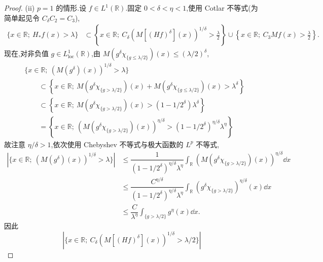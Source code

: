\begin{proof}
(ii) $p = 1$ 的情形.设 $f \in L^{1}(\mathbb{R})$.固定 $0 < \delta < \eta < 1$,使用 Cotlar 不等式(为简单起见令 $C_{\delta}C_{2} = C_{3}$),
\begin{equation}\tag{1.9.3}\begin{aligned}
\{x \in \mathbb{R};\ H_{*}f(x) > \lambda\}&\subset \left\{x \in \mathbb{R};\ C_{\delta}\left(M\left[(Hf)^{\delta}\right](x)\right)^{1/\delta} > \frac{\lambda}{2}\right\} \cup \left\{x \in \mathbb{R};\ C_{3}Mf(x) > \frac{\lambda}{2}\right\}.
 \end{aligned}\label{eq:1.9.3}\end{equation}
现在,对非负值 $g \in L_{\mathrm{loc}}^{1}(\mathbb{R})$,由 $M(g^{\delta}\chi_{\{g \leq \lambda/2\}})(x) \leq (\lambda/2)^{\delta}$,
\begin{align*}
& \{x \in \mathbb{R};\ \left(M(g^{\delta})(x)\right)^{1/\delta} > \lambda\} \\
& \qquad \subset \left\{x \in \mathbb{R};\ M(g^{\delta}\chi_{\{g > \lambda/2\}})(x) + M(g^{\delta}\chi_{\{g \leq \lambda/2\}})(x) > \lambda^{\delta}\right\} \\
& \qquad \subset \left\{x \in \mathbb{R};\ M(g^{\delta}\chi_{\{g > \lambda/2\}})(x) > (1 - 1/2^{\delta})\lambda^{\delta}\right\} \\
& \qquad = \left\{x \in \mathbb{R};\ \left(M(g^{\delta}\chi_{\{g > \lambda/2\}})(x)\right)^{\eta/\delta} > (1 - 1/2^{\delta})^{\eta/\delta}\lambda^{\eta}\right\}
\end{align*}
故注意 $\eta/\delta > 1$,依次使用 Chebyshev 不等式与极大函数的 $L^{p}$ 不等式,
\begin{align*}
|\{x \in \mathbb{R};\ \left(M(g^{\delta})(x)\right)^{1/\delta} > \lambda\}|&\leq \dfrac{1}{(1 - 1/2^{\delta})^{\eta/\delta}\lambda^{\eta}}\displaystyle\int_{\mathbb{R}}\left(M(g^{\delta}\chi_{\{g > \lambda/2\}})(x)\right)^{\eta/\delta}\dd x  \\
&\leq \dfrac{C^{\eta/\delta}}{(1 - 1/2^{\delta})^{\eta/\delta}\lambda^{\eta}}\displaystyle\int_{\mathbb{R}}\left(g^{\delta}\chi_{\{g > \lambda/2\}}\right)^{\eta/\delta}(x)\dd x \\
&\leq \dfrac{C}{\lambda^{\eta}}\displaystyle\int_{\{g > \lambda/2\}}g^{\eta}(x)\dd x.
\end{align*}
因此
\begin{equation}\tag{1.9.4}
|\{x \in \mathbb{R};\ C_{\delta}\left(M\left[(Hf)^{\delta}\right](x)\right)^{1/\delta} > \lambda/2\}|
\label{eq:1.9.4}\end{equation}
\begin{equation}\tag{1.9.5}

\end{equation}
\end{proof}
